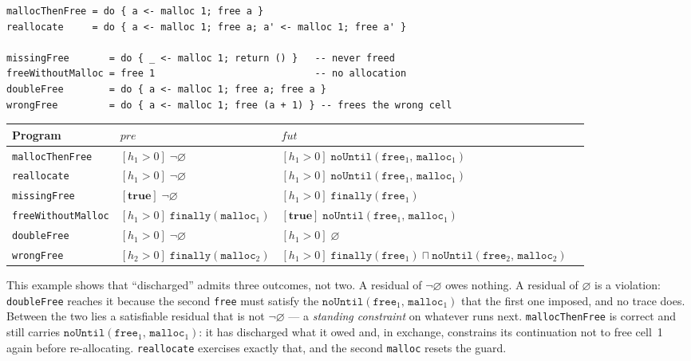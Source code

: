\documentclass[acmsmall,screen]{acmart}
\newcommand{\pre}{\mathit{pre}}
\newcommand{\fut}{\mathit{fut}}
\newcommand{\finally}[1]{\mathtt{finally}(#1)}
\newcommand{\noUntil}[2]{\mathtt{noUntil}(#1,\,#2)}
\newcommand{\univ}{\neg\varnothing}
\begin{document}
\begin{lstlisting}
mallocThenFree = do { a <- malloc 1; free a }
reallocate     = do { a <- malloc 1; free a; a' <- malloc 1; free a' }

missingFree       = do { _ <- malloc 1; return () }   -- never freed
freeWithoutMalloc = free 1                            -- no allocation
doubleFree        = do { a <- malloc 1; free a; free a }
wrongFree         = do { a <- malloc 1; free (a + 1) } -- frees the wrong cell
\end{lstlisting}

\begin{center}
\small
\begin{tabular}{llll}
\toprule
Program & $\pre$ & $\fut$ \\
\midrule
\lstinline{mallocThenFree}    & $[h_1{>}0]\;\univ$
                              & $[h_1{>}0]\;\noUntil{\mathtt{free}_1}{\mathtt{malloc}_1}$ \\
\lstinline{reallocate}        & $[h_1{>}0]\;\univ$
                              & $[h_1{>}0]\;\noUntil{\mathtt{free}_1}{\mathtt{malloc}_1}$ \\
\midrule
\lstinline{missingFree}       & $[\mathbf{true}]\;\univ$
                              & $[h_1{>}0]\;\finally{\mathtt{free}_1}$ \\
\lstinline{freeWithoutMalloc} & $[h_1{>}0]\;\finally{\mathtt{malloc}_1}$
                              & $[\mathbf{true}]\;\noUntil{\mathtt{free}_1}{\mathtt{malloc}_1}$ \\
\lstinline{doubleFree}        & $[h_1{>}0]\;\univ$
                              & $[h_1{>}0]\;\varnothing$ \\
\lstinline{wrongFree}         & $[h_2{>}0]\;\finally{\mathtt{malloc}_2}$
                              & $[h_1{>}0]\;\finally{\mathtt{free}_1} \sqcap
                                 \noUntil{\mathtt{free}_2}{\mathtt{malloc}_2}$ \\
\bottomrule
\end{tabular}
\end{center}

\noindent
This example shows that ``discharged'' admits three outcomes, not two.
A residual of $\univ$ owes nothing.
A residual of $\varnothing$ is a violation: \lstinline{doubleFree} reaches
it because the second \lstinline{free} must satisfy the
$\noUntil{\mathtt{free}_1}{\mathtt{malloc}_1}$ that the first one imposed,
and no trace does.
Between the two lies a satisfiable residual that is not $\univ$ --- a
\emph{standing constraint} on whatever runs next.
\lstinline{mallocThenFree} is correct and still carries
$\noUntil{\mathtt{free}_1}{\mathtt{malloc}_1}$: it has discharged what it
owed and, in exchange, constrains its continuation not to free cell~1 again
before re-allocating.
\lstinline{reallocate} exercises exactly that, and the second
\lstinline{malloc} resets the guard.
\end{document}
